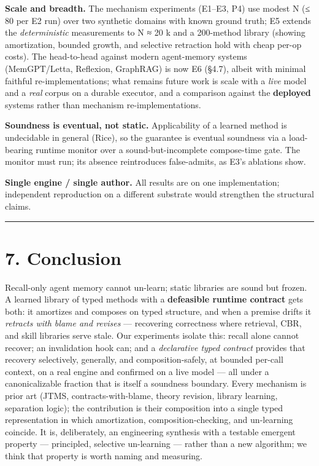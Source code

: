 \documentclass[11pt]{article}
\begin{document}
\textbf{Scale and breadth.} The mechanism experiments (E1–E3, P4) use modest N (≤ 80 per E2 run) over two synthetic domains with known ground truth; E5 extends the \emph{deterministic} measurements to N ≈ 20 k and a 200-method library (showing amortization, bounded growth, and selective retraction hold with cheap per-op costs). The head-to-head against modern agent-memory systems (MemGPT/Letta, Reflexion, GraphRAG) is now E6 (§4.7), albeit with minimal faithful re-implementations; what remains future work is scale with a \emph{live} model and a \emph{real} corpus on a durable executor, and a comparison against the \textbf{deployed} systems rather than mechanism re-implementations.

\textbf{Soundness is eventual, not static.} Applicability of a learned method is undecidable in general (Rice), so the guarantee is eventual soundness via a load-bearing runtime monitor over a sound-but-incomplete compose-time gate. The monitor must run; its absence reintroduces false-admits, as E3's ablations show.

\textbf{Single engine / single author.} All results are on one implementation; independent reproduction on a different substrate would strengthen the structural claims.

\medskip\hrule\medskip

\section*{7. Conclusion}

Recall-only agent memory cannot un-learn; static libraries are sound but frozen. A learned library of typed methods with a \textbf{defeasible runtime contract} gets both: it amortizes and composes on typed structure, and when a premise drifts it \emph{retracts with blame and revises} — recovering correctness where retrieval, CBR, and skill libraries serve stale. Our experiments isolate this: recall alone cannot recover; an invalidation hook can; and a \emph{declarative typed contract} provides that recovery selectively, generally, and composition-safely, at bounded per-call context, on a real engine and confirmed on a live model — all under a canonicalizable fraction that is itself a soundness boundary. Every mechanism is prior art (JTMS, contracts-with-blame, theory revision, library learning, separation logic); the contribution is their composition into a single typed representation in which amortization, composition-checking, and un-learning coincide. It is, deliberately, an engineering synthesis with a testable emergent property — principled, selective un-learning — rather than a new algorithm; we think that property is worth naming and measuring.
\end{document}
